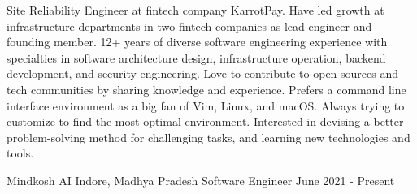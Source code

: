 \documentclass{my_resume}
\begin{document}
	\address{Madurai, Tamil Nadu}
	\resumeHeading

	\begin{cvparagraph}
		Site Reliability Engineer at fintech company KarrotPay. Have led growth at
		infrastructure departments in two fintech companies as lead engineer and
		founding member. 12+ years of diverse software engineering experience with
		specialties in software architecture design, infrastructure operation, 
		backend development, and security engineering. Love to contribute to 
		open sources and tech communities by sharing knowledge and experience. Prefers a command line interface environment as a big fan of Vim, Linux, and macOS. Always trying to customize to find the most optimal environment. Interested in devising a better problem-solving method for challenging tasks, and learning new technologies and tools.
	\end{cvparagraph}


	\begin{cventries}
		\cventry
			{Mindkosh AI} %
			{Indore, Madhya Pradesh} %
			{Software Engineer} %
			{June 2021 - Present} %

		\begin{cvitems} %
		\end{cvitems}
	\end{cventries}
\end{document}
